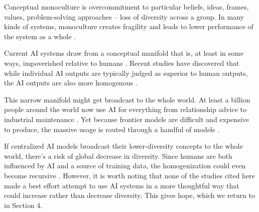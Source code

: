 \documentclass[12pt]{article}
\begin{document}
Conceptual monoculture is overcommitment to particular beliefs, ideas, frames, values, problem-solving approaches -- loss of diversity across a group. In many kinds of systems, monoculture creates fragility and leads to lower performance of the system as a whole \citep{tilman1996biodiversity, kleinberg2021algorithmic,scott1998seeing, haldane2013rethinking}. 

Current AI systems draw from a conceptual manifold that is, at least in some ways, impoverished relative to humans \citep{messeri2024artificial, crawford2021atlas, selwyn2024limits, kirk2023understanding}. Recent studies have discovered that while individual AI outputs are typically judged as superior to human outputs, the AI outputs are also more homogenous \citep{doshi2024generative, beguvs2024experimental, zhou2024generative, kosmyna2025your, agarwal2025ai, padmakumar2023does, xu2025echoes}. 

This narrow manifold might get broadcast to the whole world. At least a billion people around the world now use AI for everything from relationship advice to industrial maintenance \citep{chatterji2025chatgpt, mckinsey2025stateofai, openai2025enterprise, mccain2025claude, honeywell2024google, techcrunch2025sam, ccia2025survey}. Yet because frontier models are difficult and expensive to produce, the massive usage is routed through a handful of models \citep{bommasani2021opportunities}. 

If centralized AI models broadcast their lower-diversity concepts to the whole world, there's a risk of global decrease in diversity. Since humans are both influenced by AI and a source of training data, the homogenization could even become recursive \citep{chaney2018algorithmic}. However, it is worth noting that none of the studies cited here made a best effort attempt to use AI systems in a more thoughtful way that could increase rather than decrease diversity. This gives hope, which we return to in Section 4.



\end{document}
